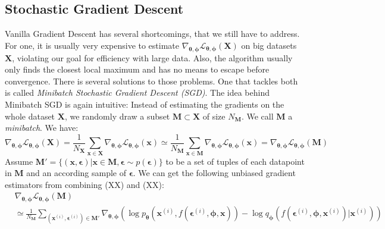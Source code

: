 \documentclass[12pt]{report}
\theoremstyle{definition}
\begin{document}
\subsection{Stochastic Gradient Descent} 
Vanilla Gradient Descent has several shortcomings, that we still have to address. For one, it is usually very expensive to estimate $\nabla_{\pmb{\theta}, \pmb{\phi}}\mathcal{L}_{\pmb{\theta}, \pmb{\phi}}(\mathbf{X})$ on big datasets $\mathbf{X}$, violating our goal for efficiency with large data. Also, the algorithm usually only finds the closest local maximum and has no means to escape before convergence. There is several solutions to those problems. One that tackles both is called \emph{Minibatch Stochastic Gradient Descent (SGD)}. 
The idea behind Minibatch SGD is again intuitive: Instead of estimating the gradients on the whole dataset $\mathbf{X}$, we randomly draw a subset $\mathbf{M} \subset \mathbf{X}$ of size $N_{\mathbf{M}}$. We call $\mathbf{M}$ a \emph{minibatch}. We have:
\begin{equation}
\nabla_{\pmb{\theta}, \pmb{\phi}}\mathcal{L}_{\pmb{\theta}, \pmb{\phi}}(\mathbf{X}) 
= \frac{1}{N_{\mathbf{X}}} \sum_{\mathbf{x} \in \mathbf{X}} \nabla_{\pmb{\theta}, \pmb{\phi}} \mathcal{L}_{\mathbf{\theta}, \mathbf{\phi}}(\mathbf{x}) 
\simeq \frac{1}{N_{\mathbf{M}}} \sum_{\mathbf{x} \in \mathbf{M}} \nabla_{\pmb{\theta}, \pmb{\phi}} \mathcal{L}_{\mathbf{\theta}, \mathbf{\phi}}(\mathbf{x})
= \nabla_{\pmb{\theta}, \pmb{\phi}}\mathcal{L}_{\pmb{\theta}, \pmb{\phi}}(\mathbf{M}) 
\end{equation}
Assume $\mathbf{M}'=\{(\mathbf{x}, \pmb{\epsilon}) |  \mathbf{x} \in \mathbf{M}, \pmb{\epsilon} \sim p(\pmb{\epsilon})\}$ to be a set of tuples of each datapoint in $\mathbf{M}$ and an according sample of $\pmb{\epsilon}$. We can get the following unbiased gradient estimators from combining (XX) and (XX):
\begin{equation}
\begin{split}
& \nabla_{\pmb{\theta}, \pmb{\phi}}\mathcal{L}_{\pmb{\theta}, \pmb{\phi}}(\mathbf{M}) \\
&	\simeq \frac{1}{N_{\mathbf{M}}} \sum_{(\mathbf{x}^{(i)}, \pmb{\epsilon}^{(i)}) \in \mathbf{M}'} \nabla_{\pmb{\theta}, \pmb{\phi}}(\log p_{\mathbf{\theta}}(\mathbf{x}^{(i)}, f(\pmb{\epsilon}^{(i)}, \pmb{\phi}, \mathbf{x})) - \log q_{\mathbf{\phi}}(f(\pmb{\epsilon}^{(i)}, \pmb{\phi}, \mathbf{x}^{(i)})|\mathbf{x}^{(i)}))
\end{split}
\end{equation}
\end{document}
